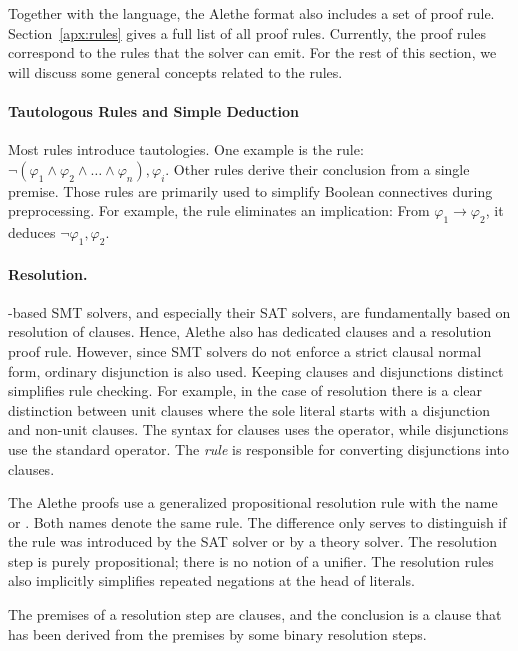 \documentclass{scrartcl}
\begin{document}
Together with the language, the Alethe format also includes a set
of proof rule.
Section~\ref{apx:rules}
gives a full list of all
proof rules.  Currently, the proof rules correspond to the rules
that the solver {\verit} can emit.  For the rest of this section, we will discuss some
general concepts related to the rules.

\paragraph{Tautologous Rules and Simple Deduction}
Most rules introduce tautologies. One example is
the  rule: $\neg (\varphi_1 \land \varphi_2 \land
\dots \land \varphi_n), \varphi_i$.
%
Other rules derive their conclusion from a single premise.
%
Those rules are primarily used to simplify Boolean
connectives during preprocessing. For example, the 
rule eliminates an implication: From $\varphi_1 → \varphi_2$,
it deduces $\neg \varphi_1, \varphi_2$.


\paragraph{Resolution.}
{\cdclt}-based SMT solvers, and especially their SAT solvers,
are fundamentally based on resolution of clauses.
Hence, Alethe also has dedicated clauses and a resolution proof
rule.  However, since SMT solvers do not enforce a strict
clausal normal form, ordinary disjunction is also used.
Keeping clauses and disjunctions distinct simplifies rule checking.
For example, in the case of
resolution there is a clear distinction between unit clauses where
the sole literal starts with a disjunction and non-unit clauses.  The
syntax for clauses uses the  operator, while disjunctions
use the standard {\smtlib}  operator. The 
\emph{rule} is responsible for converting disjunctions into clauses.

The Alethe proofs use a generalized propositional resolution
rule with the name  or .
Both names denote the same rule.  The difference only serves to distinguish
if the rule was introduced by
the SAT solver or by a theory solver. The resolution step is purely
propositional; there is no notion of a unifier.  The resolution
rules also implicitly simplifies repeated negations at the head
of literals.

The premises of a resolution step are clauses, and the conclusion
is a clause that has been derived from the premises by some binary
resolution steps.
\end{document}
